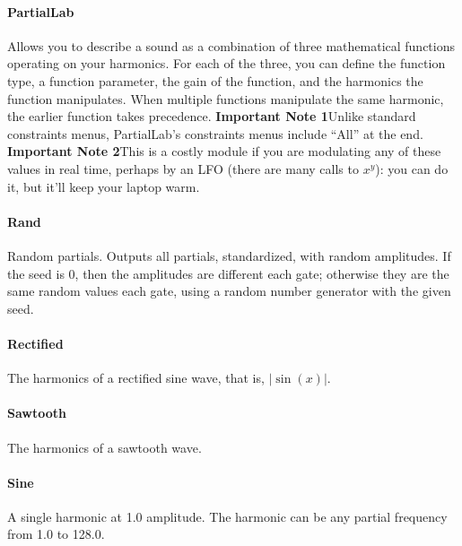 \documentclass{article}
\begin{document}
\paragraph{PartialLab}  Allows you to describe a sound as a combination of three mathematical functions operating on your harmonics.  For each of the three, you can define the function type, a function parameter, the gain of the function, and the harmonics the function manipulates.  When multiple functions manipulate the same harmonic, the earlier function takes precedence.  {\bf Important Note 1}\quad Unlike standard constraints menus, PartialLab's constraints menus include ``All'' at the end.  {\bf Important Note 2}\quad This is a costly module if you are modulating any of these values in real time, perhaps by an LFO (there are many calls to \(x^y\)): you can do it, but it'll keep your laptop warm.

\paragraph{Rand}  Random partials.  Outputs all partials, standardized, with random amplitudes.  If the seed is 0, then the amplitudes are different each gate; otherwise they are the same random values each gate, using a random number generator with the given seed.

\paragraph{Rectified}  The harmonics of a rectified sine wave, that is, \(|\sin(x)|\).

\paragraph{Sawtooth}  The harmonics of a sawtooth wave.

\paragraph{Sine}  A single harmonic at 1.0 amplitude.  The harmonic can be any partial frequency from 1.0 to 128.0.
\end{document}
